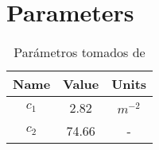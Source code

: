 \chapter{Parameters}

\begin{table}[ht!]
    \center
    \begin{tabular}{|c|c|c|}
        \hline
        Name & Value & Units \\
        \hline
        $c_1$ & 2.82  & $m^{-2}$ \\
        $c_2$ & 74.66 & - \\
        \hline
    \end{tabular} 
    \caption{Parámetros tomados de \cite{Martinez-Ruiz2019}}
\end{table}